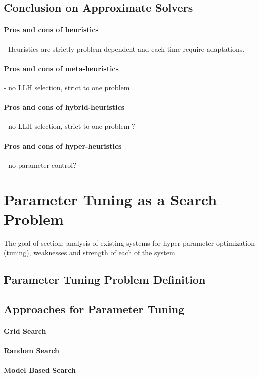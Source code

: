\subsection{Conclusion on Approximate Solvers}
\paragraph{Pros and cons of heuristics} - Heuristics are strictly problem dependent and each time require adaptations.
\paragraph{Pros and cons of meta-heuristics} - no LLH selection, strict to one problem
\paragraph{Pros and cons of hybrid-heuristics} - no LLH selection, strict to one problem ? 
\paragraph{Pros and cons of hyper-heuristics} - no parameter control?


\section{Parameter Tuning as a Search Problem}\label{bg: parameter tuning}
The goal of section: analysis of existing systems for hyper-parameter optimization (tuning), weaknesses and strength of each of the system

\subsection{Parameter Tuning Problem Definition}
\subsection{Approaches for Parameter Tuning}
\paragraph{Grid Search}
\paragraph{Random Search}
\paragraph{Model Based Search}

